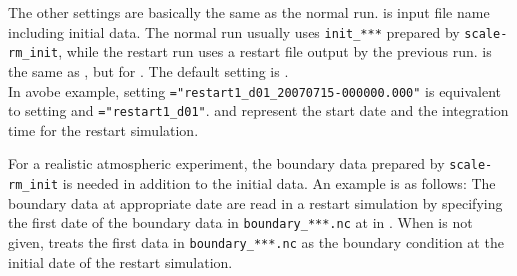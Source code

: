 The other settings are basically the same as the normal run.
 is input file name including initial data.
The normal run usually uses \verb|init_***| prepared by \verb|scale-rm_init|,
while the restart run uses a restart file output by the previous run.
%
 is the same as ,
but for .
The default setting is .\\
In avobe example, setting  \verb|="restart1_d01_20070715-000000.000"| is equivalent to
setting  and  \verb|="restart1_d01"|.
 and  represent the start date and the integration time for the restart simulation.



For a realistic atmospheric experiment, the boundary data prepared by \verb|scale-rm_init|
is needed in addition to the initial data. An example is as follows:
The boundary data at appropriate date are read in a restart simulation by specifying the first date of the boundary data in \verb|boundary_***.nc|  at  in . When  is not given, \scalerm treats the first data in \verb|boundary_***.nc|  as the boundary condition at the initial date of the restart simulation.

